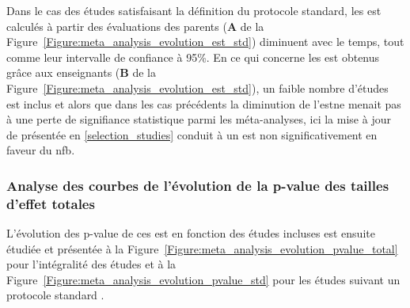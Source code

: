 \begin{itemize}
Dans le cas des études satisfaisant la définition du protocole standard, les \gls{est} calculés à partir des évaluations des parents 
(\textbf{A} de la Figure~\ref{Figure:meta_analysis_evolution_est_std}) diminuent avec le temps, tout comme leur intervalle de confiance à 95\%. 
En ce qui concerne les \gls{est} obtenus grâce aux enseignants (\textbf{B} de la Figure~\ref{Figure:meta_analysis_evolution_est_std}), un faible nombre d'études 
est inclus et alors que dans les cas précédents la diminution de l'\gls{est}ne menait pas à une perte de signifiance statistique parmi les méta-analyses, 
ici la mise à jour de \citet{Cortese2016} présentée en \ref{selection_studies} conduit à un \gls{est} non significativement en faveur du \gls{nfb}. 

\subsubsection{Analyse des courbes de l'évolution de la p-value des tailles d'effet totales}

L'évolution des p-value de ces \gls{est} en fonction des études incluses est ensuite étudiée et présentée à la Figure~\ref{Figure:meta_analysis_evolution_pvalue_total} pour 
l'intégralité des études et à la Figure~\ref{Figure:meta_analysis_evolution_pvalue_std} pour les études suivant un protocole standard \citep{Arns2014}.


\end{itemize}
